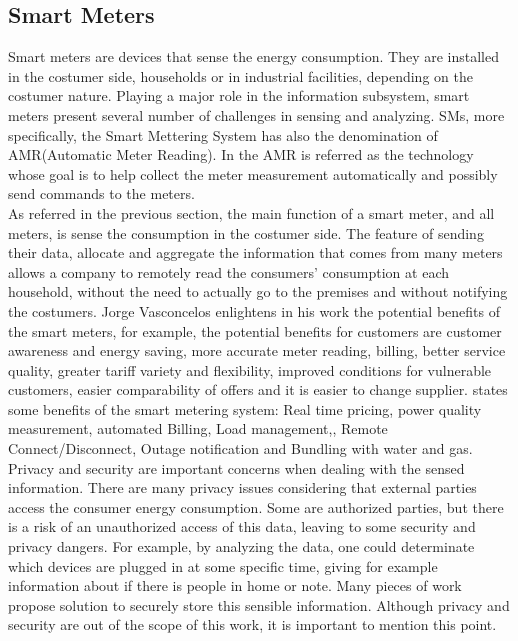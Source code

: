 \subsection{Smart Meters}
Smart meters are devices that sense the energy consumption. They are installed in the costumer side,  households or in  industrial facilities, depending on the costumer nature. Playing a major role in the information subsystem, smart meters present several number of challenges in sensing and analyzing\cite{journals/spm/ErkinTLP13}. SMs, more specifically, the Smart Mettering System has also the denomination of AMR(Automatic Meter Reading). In \cite{khalifa2011survey} the AMR is referred as the technology whose goal is to help collect the meter measurement automatically and possibly send commands to the meters.\\
As referred in the previous section, the main function of a smart meter, and all meters, is sense the consumption in the costumer side. The feature of sending their data, allocate and aggregate the information that comes from many meters allows a company to remotely read the consumers' consumption at each household, without the need to actually go to the premises and without notifying the costumers\cite{Ericsson_2}. Jorge Vasconcelos \cite{RePEc:erp:euirsc:p0193} enlightens in his work the potential benefits of the smart meters, for  example, the potential benefits for customers are customer awareness and energy saving, more accurate meter reading, billing, better service quality, greater tariff variety and flexibility, improved conditions for vulnerable customers, easier comparability of offers and it is easier to change supplier. \cite{khalifa2011survey} states some benefits of the smart metering system: Real time pricing, power quality measurement, automated Billing, Load management,, Remote Connect/Disconnect, Outage notification and Bundling with water and gas.\\
Privacy and security are important concerns when dealing with the sensed information. There are many privacy issues considering that external parties access the consumer energy consumption. Some are authorized parties, but there is a risk of an unauthorized access of this data, leaving to some security and privacy dangers. For example, by analyzing the data, one could determinate which devices are plugged in at some specific time, giving for example information about if there is people in home or note. Many pieces of work propose solution to securely store this sensible information. Although privacy and security are out of the scope of this work, it is important to mention this point.\\

